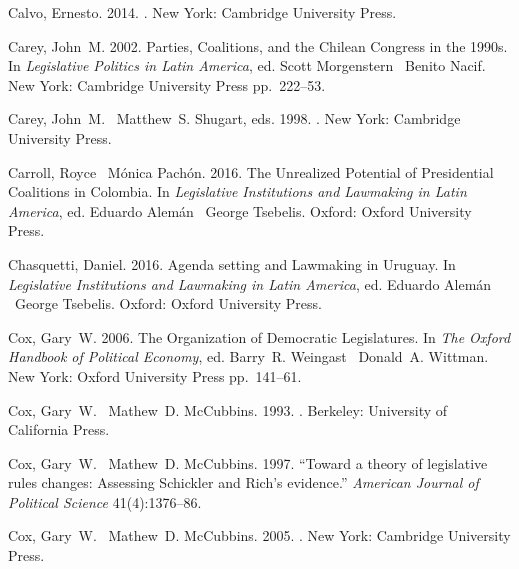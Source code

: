 \documentclass[letter,12pt]{article}
\begin{document}
\begin{thebibliography}{xx}
Calvo, Ernesto. 2014.
.
\newblock New York:  Cambridge University Press.

Carey, John~M. 2002.
\newblock Parties, Coalitions, and the {Chilean} Congress in the 1990s.  In
  {\em Legislative Politics in Latin America}, ed. Scott Morgenstern
  \harvardand\ Benito Nacif.
\newblock New York:  Cambridge University Press pp.~222--53.

Carey, John~M. \harvardand\ Matthew~S. Shugart, eds. 1998.
.
\newblock New York:  Cambridge University Press.

Carroll, Royce \harvardand\ M\'onica Pach\'on. 2016.
\newblock The Unrealized Potential of Presidential Coalitions in Colombia.  In
  {\em Legislative Institutions and Lawmaking in Latin America}, ed. Eduardo
  Alem\'an \harvardand\ George Tsebelis.
\newblock Oxford:  Oxford University Press.

Chasquetti, Daniel. 2016.
\newblock Agenda setting and Lawmaking in Uruguay.  In {\em Legislative
  Institutions and Lawmaking in Latin America}, ed. Eduardo Alem\'an
  \harvardand\ George Tsebelis.
\newblock Oxford:  Oxford University Press.

Cox, Gary~W. 2006.
\newblock The Organization of Democratic Legislatures.  In {\em The Oxford
  Handbook of Political Economy}, ed. Barry~R. Weingast \harvardand\ Donald~A.
  Wittman.
\newblock New York:  Oxford University Press pp.~141--61.

Cox, Gary~W. \harvardand\ Mathew~D. McCubbins. 1993.
.
\newblock Berkeley:  University of California Press.

Cox, Gary~W. \harvardand\ Mathew~D. McCubbins. 1997.
\newblock ``Toward a theory of legislative rules changes: Assessing {S}chickler
  and {R}ich's evidence.'' {\em American Journal of Political Science}
  41(4):1376--86.

Cox, Gary~W. \harvardand\ Mathew~D. McCubbins. 2005.
.
\newblock New York:  Cambridge University Press.


\end{thebibliography}
\end{document}
